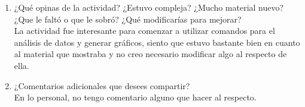 \begin{enumerate}
\item ¿Qué opinas de la actividad? ¿Estuvo compleja? ¿Mucho material nuevo? ¿Que le faltó o que le sobró? ¿Qué modificarías para mejorar?
\medskip
\\ La actividad fue interesante para comenzar a utilizar comandos para el análisis de datos y generar gráficos, siento que estuvo bastante bien en cuanto al material que mostraba y no creo necesario modificar algo al respecto de ella.

\item ¿Comentarios adicionales que desees compartir?
\medskip
\\ En lo personal, no tengo comentario alguno que hacer al respecto.

\end{enumerate}

